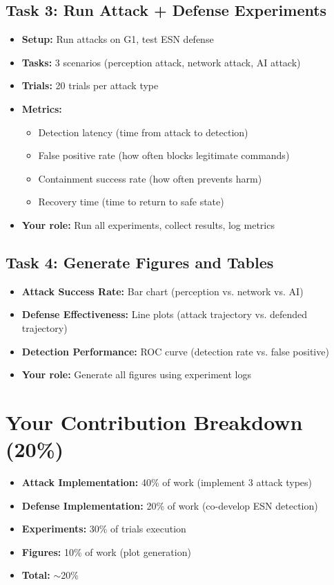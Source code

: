 \documentclass[conference]{IEEEtran}
\begin{document}
\subsection{Task 3: Run Attack + Defense Experiments}
\begin{itemize}
    \item \textbf{Setup:} Run attacks on G1, test ESN defense
    \item \textbf{Tasks:} 3 scenarios (perception attack, network attack, AI attack)
    \item \textbf{Trials:} 20 trials per attack type
    \item \textbf{Metrics:}
    \begin{itemize}
        \item Detection latency (time from attack to detection)
        \item False positive rate (how often blocks legitimate commands)
        \item Containment success rate (how often prevents harm)
        \item Recovery time (time to return to safe state)
    \end{itemize}
    \item \textbf{Your role:} Run all experiments, collect results, log metrics
\end{itemize}

\subsection{Task 4: Generate Figures and Tables}
\begin{itemize}
    \item \textbf{Attack Success Rate:} Bar chart (perception vs. network vs. AI)
    \item \textbf{Defense Effectiveness:} Line plots (attack trajectory vs. defended trajectory)
    \item \textbf{Detection Performance:} ROC curve (detection rate vs. false positive)
    \item \textbf{Your role:} Generate all figures using experiment logs
\end{itemize}

\section{Your Contribution Breakdown (20\%)}

\begin{itemize}
    \item \textbf{Attack Implementation:} 40\% of work (implement 3 attack types)
    \item \textbf{Defense Implementation:} 20\% of work (co-develop ESN detection)
    \item \textbf{Experiments:} 30\% of trials execution
    \item \textbf{Figures:} 10\% of work (plot generation)
    \item \textbf{Total:} $\sim$20\%
\end{itemize}
\end{document}
